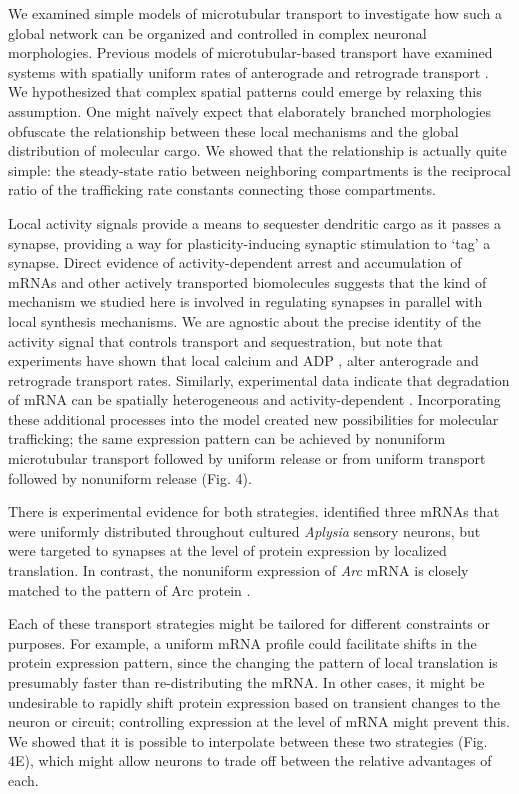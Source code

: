 \documentclass[10pt]{wlpeerj}
\begin{document}
We examined simple models of microtubular transport to investigate how such a global network can be organized and controlled in complex neuronal morphologies.
Previous models of microtubular-based transport have examined systems with spatially uniform rates of anterograde and retrograde transport \citep{Smith_2001,Bressloff_2006}.
We hypothesized that complex spatial patterns could emerge by relaxing this assumption. One might na\"ively expect that elaborately branched morphologies obfuscate the relationship between these local mechanisms and the global distribution of molecular cargo.
We showed that the relationship is actually quite simple: the steady-state ratio between neighboring compartments is the reciprocal ratio of the trafficking rate constants connecting those compartments.

Local activity signals provide a means to sequester dendritic cargo as it passes a synapse, providing a way for plasticity-inducing synaptic stimulation to `tag' a synapse.
Direct evidence of activity-dependent arrest \citep{Soundararajan_2014} and accumulation \citep{Krichevsky_2001,Buxbaum_2014a} of mRNAs and other actively transported biomolecules suggests that the kind of mechanism we studied here is involved in regulating synapses in parallel with local synthesis mechanisms.
We are agnostic about the precise identity of the activity signal that controls transport and sequestration, but note that experiments have shown that local calcium \citep{Wang_2009} and ADP \citep{Mironov_2007}, alter anterograde and retrograde transport rates.
Similarly, experimental data indicate that degradation of mRNA can be spatially heterogeneous and activity-dependent \citep{Farris_2014}.
Incorporating these additional processes into the model created new possibilities for molecular trafficking; the same expression pattern can be achieved by nonuniform microtubular transport followed by uniform release or from uniform transport followed by nonuniform release (Fig. 4).

There is experimental evidence for both strategies. \cite{Kim_2015} identified three mRNAs that were uniformly distributed throughout cultured \textit{Aplysia} sensory neurons, but were targeted to synapses at the level of protein expression by localized translation.
In contrast, the nonuniform expression of \textit{Arc} mRNA is closely matched to the pattern of Arc protein \citep{Farris_2014, Steward_2015}. 

Each of these transport strategies might be tailored for different constraints or purposes.
For example, a uniform mRNA profile could facilitate shifts in the protein expression pattern, since the changing the pattern of local translation is presumably faster than re-distributing the mRNA.
In other cases, it might be undesirable to rapidly shift protein expression based on transient changes to the neuron or circuit; controlling expression at the level of mRNA might prevent this.
We showed that it is possible to interpolate between these two strategies (Fig. 4E), which might allow neurons to trade off between the relative advantages of each.
\end{document}

